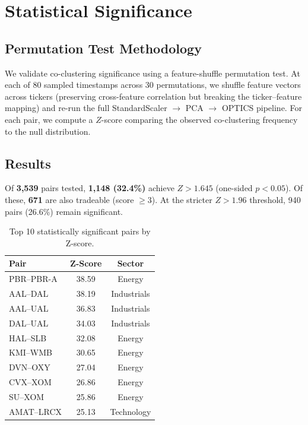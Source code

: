\documentclass[11pt, a4paper]{article}
\begin{document}
\section{Statistical Significance}

\subsection{Permutation Test Methodology}

We validate co-clustering significance using a feature-shuffle permutation test. At each of 80 sampled timestamps across 30 permutations, we shuffle feature vectors across tickers (preserving cross-feature correlation but breaking the ticker--feature mapping) and re-run the full StandardScaler $\to$ PCA $\to$ OPTICS pipeline. For each pair, we compute a $Z$-score comparing the observed co-clustering frequency to the null distribution.

\subsection{Results}

Of \textbf{3,539} pairs tested, \textbf{1,148 (32.4\%)} achieve $Z > 1.645$ (one-sided $p < 0.05$). Of these, \textbf{671} are also tradeable (score $\geq 3$). At the stricter $Z > 1.96$ threshold, 940 pairs (26.6\%) remain significant.

\begin{table}[H]
\centering
\caption{Top 10 statistically significant pairs by Z-score.}
\begin{tabular}{@{}lcc@{}}
\toprule
\textbf{Pair} & \textbf{Z-Score} & \textbf{Sector} \\
\midrule
PBR--PBR-A  & 38.59 & Energy \\
AAL--DAL    & 38.19 & Industrials \\
AAL--UAL    & 36.83 & Industrials \\
DAL--UAL    & 34.03 & Industrials \\
HAL--SLB    & 32.08 & Energy \\
KMI--WMB    & 30.65 & Energy \\
DVN--OXY    & 27.04 & Energy \\
CVX--XOM    & 26.86 & Energy \\
SU--XOM     & 25.86 & Energy \\
AMAT--LRCX  & 25.13 & Technology \\
\bottomrule
\end{tabular}
\label{tab:permutation}
\end{table}
\end{document}
